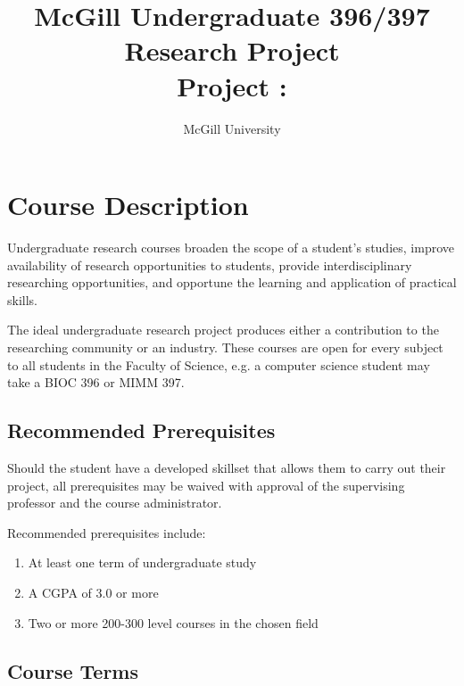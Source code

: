 

\title{McGill Undergraduate 396/397 Research Project \vspace{.2em} \\
Project :  \\}%
\author{
McGill University
}
\date{}



\maketitle

\section*{Course Description}

	Undergraduate research courses broaden the scope of a student's studies, improve availability of research opportunities to students, provide interdisciplinary researching opportunities, and opportune the learning and application of practical skills.
	
	The ideal undergraduate research project produces either a contribution to the researching community or an industry.
	These courses are open for every subject to all students in the Faculty of Science, e.g. a computer science student may take a BIOC 396 or MIMM 397.

\subsection*{Recommended Prerequisites}

	Should the student have a developed skillset that allows them to carry out their project, all prerequisites may be waived with approval of the supervising professor and the course administrator.
	
	Recommended prerequisites include:
	\begin{enumerate}
		\item At least one term of undergraduate study
		\item A CGPA of 3.0 or more
		\item Two or more 200-300 level courses in the chosen field
	\end{enumerate}

\subsection*{Course Terms}

